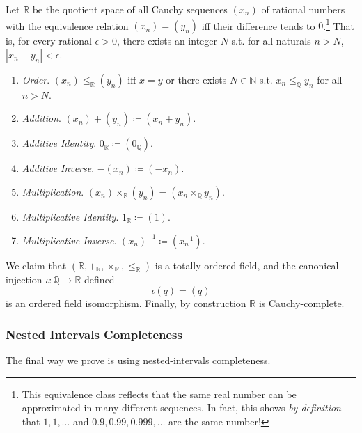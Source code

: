 \documentclass{article}
\begin{document}
      \begin{theorem}
        Let $\mathbb{R}$ be the quotient space of all Cauchy sequences $(x_n)$ of rational numbers with the equivalence relation $(x_n) = (y_n)$ iff their difference tends to $0$.\footnote{This equivalence class reflects that the same real number can be approximated in many different sequences. In fact, this shows \textit{by definition} that $1, 1, \ldots$ and $0.9, 0.99, 0.999, \ldots$ are the same number!} That is, for every rational $\epsilon > 0$, there exists an integer $N$ s.t. for all naturals $n > N$, $|x_n - y_n| < \epsilon$. 
        \begin{enumerate}
          \item \textit{Order}. $(x_n) \leq_{\mathbb{R}} (y_n)$ iff $x = y$ or there exists $N \in \mathbb{N}$ s.t. $x_n \leq_{\mathbb{Q}} y_n$ for all $n > N$. 
          \item \textit{Addition}. $(x_n) + (y_n) \coloneqq (x_n + y_n)$. 
          \item \textit{Additive Identity}. $0_{\mathbb{R}} \coloneqq (0_{\mathbb{Q}})$. 
          \item \textit{Additive Inverse}. $-(x_n) \coloneqq (-x_n)$. 
          \item \textit{Multiplication}. $(x_n) \times_{\mathbb{R}} (y_n) = (x_n \times_{\mathbb{Q}} y_n)$. 
          \item \textit{Multiplicative Identity}. $1_{\mathbb{R}} \coloneqq (1)$. 
          \item \textit{Multiplicative Inverse}. $(x_n)^{-1} \coloneqq (x_n^{-1})$. 
        \end{enumerate}
        We claim that $(\mathbb{R}, +_{\mathbb{R}}, \times_{\mathbb{R}}, \leq_{\mathbb{R}})$ is a totally ordered field, and the canonical injection $\iota: \mathbb{Q} \rightarrow \mathbb{R}$ defined 
        \begin{equation}
          \iota(q) = (q)
        \end{equation} 
        is an ordered field isomorphism. Finally, by construction $\mathbb{R}$ is Cauchy-complete. 
      \end{theorem}

    \subsubsection{Nested Intervals Completeness} 

      The final way we prove is using nested-intervals completeness.  
\end{document}
